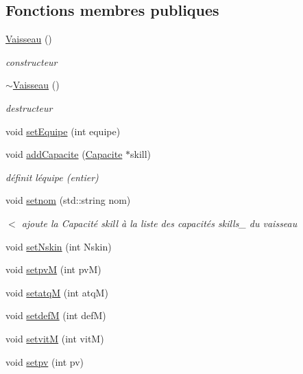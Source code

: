 \subsection*{Fonctions membres publiques}
\begin{DoxyCompactItemize}
\item 
\hyperlink{class_vaisseau_a86378a70f0d92fcc6c5c5973574b2b7d}{Vaisseau} ()
\begin{DoxyCompactList}\small\item\em constructeur \end{DoxyCompactList}\item 
\hyperlink{class_vaisseau_ae40b8e0143d6b736065207281bde2e8a}{$\sim$\+Vaisseau} ()
\begin{DoxyCompactList}\small\item\em destructeur \end{DoxyCompactList}\item 
void \hyperlink{class_vaisseau_a1b3edda1f99d55cb5c0c7cbafe156af6}{set\+Equipe} (int equipe)
\item 
void \hyperlink{class_vaisseau_a04d7069231187e7dba26a06a0aaf2508}{add\+Capacite} (\hyperlink{class_capacite}{Capacite} $\ast$skill)
\begin{DoxyCompactList}\small\item\em définit l\textquotesingle{}équipe (entier) \end{DoxyCompactList}\item 
void \hyperlink{class_vaisseau_a46174e710a959996ac9ae56f11757e61}{setnom} (std\+::string nom)
\begin{DoxyCompactList}\small\item\em $<$ ajoute la {\ttfamily Capacité} skill à la liste des capacités skills\+\_\+ du vaisseau \end{DoxyCompactList}\item 
void \hyperlink{class_vaisseau_a0d57458dc32dde2d8326c20f25172bab}{set\+Nskin} (int Nskin)
\item 
void \hyperlink{class_vaisseau_a10a33c8fed1bb1530148e98313d80a87}{setpvM} (int pvM)
\item 
void \hyperlink{class_vaisseau_ac1eaf0b717e81471f259ce94ad0afb20}{setatqM} (int atqM)
\item 
void \hyperlink{class_vaisseau_a4120a8c40229b8af08590ee3a6d00f6a}{setdefM} (int defM)
\item 
void \hyperlink{class_vaisseau_a5816b1761b1d6f12f2ee3077b938392a}{setvitM} (int vitM)
\item 
void \hyperlink{class_vaisseau_a2c9cf0b0520a6bee6408af58e3c99e34}{setpv} (int pv)

\end{DoxyCompactItemize}
